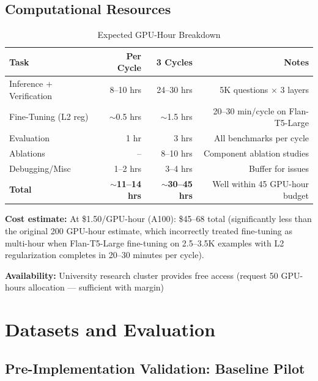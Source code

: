 \documentclass[12pt,a4paper]{article}
\theoremstyle{definition}
\begin{document}
\subsection{Computational Resources}

\begin{table}[htbp]
\centering
\caption{Expected GPU-Hour Breakdown}
\begin{tabular}{lrrr}
\toprule
\textbf{Task} & \textbf{Per Cycle} & \textbf{3 Cycles} & \textbf{Notes} \\
\midrule
Inference + Verification & 8--10 hrs & 24--30 hrs & 5K questions $\times$ 3 layers \\
Fine-Tuning (L2 reg) & $\sim$0.5 hrs & $\sim$1.5 hrs & 20--30 min/cycle on Flan-T5-Large \\
Evaluation & 1 hr & 3 hrs & All benchmarks per cycle \\
Ablations & -- & 8--10 hrs & Component ablation studies \\
Debugging/Misc & 1--2 hrs & 3--4 hrs & Buffer for issues \\
\midrule
\textbf{Total} & \textbf{$\sim$11--14 hrs} & \textbf{$\sim$30--45 hrs} & Well within 45 GPU-hour budget \\
\bottomrule
\end{tabular}
\end{table}

\textbf{Cost estimate:} At \$1.50/GPU-hour (A100): \$45--68 total (significantly less than the original 200 GPU-hour estimate, which incorrectly treated fine-tuning as multi-hour when Flan-T5-Large fine-tuning on 2.5--3.5K examples with L2 regularization completes in 20--30 minutes per cycle).

\textbf{Availability:} University research cluster provides free access (request 50 GPU-hours allocation — sufficient with margin)

\newpage

\section{Datasets and Evaluation}

\subsection{Pre-Implementation Validation: Baseline Pilot}
\end{document}
